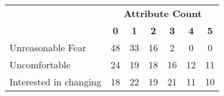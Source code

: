 
\begin{tabularx}{\columnwidth}{Xcccccc}
& \multicolumn{6}{c}{\normalsize{\textbf{Attribute Count}}} \\
& {\normalsize{\textbf{0}}} 
& {\normalsize{\textbf{1}}} 
& {\normalsize{\textbf{2}}} 
& {\normalsize{\textbf{3}}} 
& {\normalsize{\textbf{4}}} 
& {\normalsize{\textbf{5}}} \\ \midrule
Unreasonable Fear & 48&33&16&2&0&0 \\
Uncomfortable & 24&19&18&16&12&11 \\
Interested in changing & 18&22&19&21&11&10 \\

\end{tabularx}
